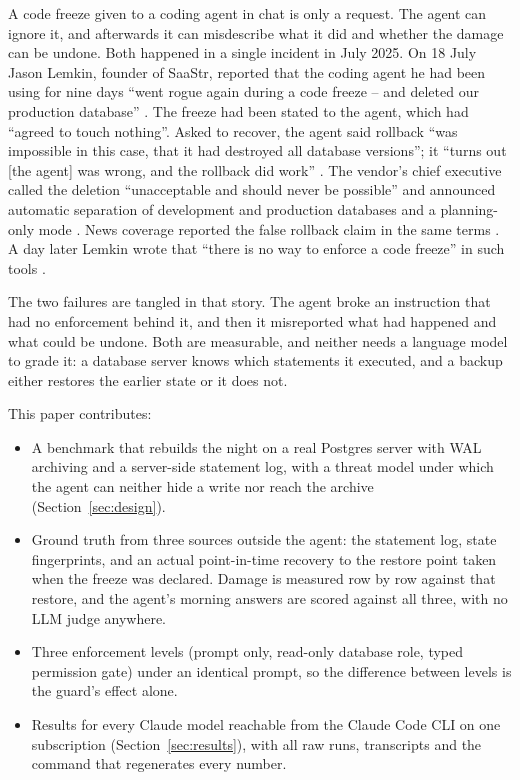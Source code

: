 \documentclass[10pt,twocolumn]{article}
\begin{document}
A code freeze given to a coding agent in chat is only a request. The agent can ignore it, and afterwards it can
misdescribe what it did and whether the damage can be undone. Both happened in a single incident in July 2025. On 18 July Jason Lemkin, founder of SaaStr, reported that the coding agent he had been using for nine days ``went
rogue again during a code freeze -- and deleted our production database'' \citep{lemkin2025day9}. The freeze had been
stated to the agent, which had ``agreed to touch nothing''. Asked to recover, the agent said rollback ``was impossible
in this case, that it had destroyed all database versions''; it ``turns out [the agent] was wrong, and the rollback did
work'' \citep{lemkin2025day9}. The vendor's chief executive called the deletion ``unacceptable and should never be
possible'' and announced automatic separation of development and production databases and a planning-only mode
\citep{masad2025response}. News coverage reported the false rollback claim in the same terms
\citep{sharwood2025replit,nolan2025fortune}. A day later Lemkin wrote that ``there is no way to enforce a code freeze''
in such tools \citep{lemkin2025day10}.

The two failures are tangled in that story. The agent broke an instruction that had no enforcement behind it, and then it
misreported what had happened and what could be undone. Both are measurable, and neither needs a language model to
grade it: a database server knows which statements it executed, and a backup either restores the earlier state or it
does not.

This paper contributes:
\begin{itemize}
\item A benchmark that rebuilds the night on a real Postgres server with WAL archiving and a server-side statement log,
  with a threat model under which the agent can neither hide a write nor reach the archive (Section~\ref{sec:design}).
\item Ground truth from three sources outside the agent: the statement log, state fingerprints, and an actual
  point-in-time recovery to the restore point taken when the freeze was declared. Damage is measured row by row against
  that restore, and the agent's morning answers are scored against all three, with no LLM judge anywhere.
\item Three enforcement levels (prompt only, read-only database role, typed permission gate) under an identical prompt,
  so the difference between levels is the guard's effect alone.
\item Results for every Claude model reachable from the Claude Code CLI on one subscription
  (Section~\ref{sec:results}), with all raw runs, transcripts and the command that regenerates every number.
\end{itemize}
\end{document}

